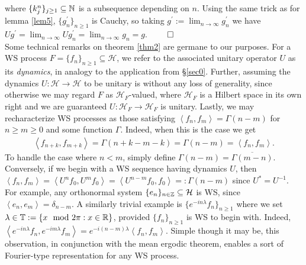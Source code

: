\documentclass[11pt]{report}
\newcommand{\mc}[1]{\mathcal{#1}}
\newcommand{\ip}[2]{\left\langle#1,#2\right\rangle }
\theoremstyle{definition}
\begin{document}
    where $\{k^n_j\}_{j\geq 1}\subseteq\mathbb{N}$ is a subsequence depending on
    $n$. Using the same trick as for lemma \ref{lem5}, $\{g_n^\prime\}_{n\geq
    1}$ is Cauchy, so taking $g^\prime:=\lim_{n\rightarrow\infty}g^\prime_n$ we
    have
    $Ug^\prime=\lim_{n\rightarrow\infty}Ug^\prime_n=\lim_{n\rightarrow\infty}g_n=g$.
    \hfill{$\qed$}\\[5pt]
    \indent Some technical remarks on theorem \ref{thm2} are germane to our
    purposes. For a WS process $F=\{f_n\}_{n\geq 1}\subseteq\mc{H}$, we refer to
    the associated unitary operator $U$ as its \textit{dynamics}, in analogy to
    the application from \S \ref{sec0}. Further, assuming the dynamics
    $U:\mc{H}\rightarrow\mc{H}$ to be unitary is without any loss of generality,
    since otherwise we may regard $F$ as $\mc{H}_F$-valued, where $\mc{H}_F$ is
    a Hilbert space in its own right and we are guaranteed
    $U:\mc{H}_F\rightarrow\mc{H}_F$ is unitary. Lastly, we may recharacterize WS
    processes as those satisfying $\ip{f_n}{f_m}=\Gamma(n-m)$ for $n\geq m\geq
    0$ and some function $\Gamma$. Indeed, when this is the case we get
    \begin{align*}
        \ip{f_{n+k}}{f_{m+k}}=\Gamma(n+k-m-k)=\Gamma(n-m)=\ip{f_n}{f_m}.
    \end{align*}
    To handle the case where $n<m$, simply define
    $\Gamma(n-m)=\overline{\Gamma(m-n)}$. Conversely, if we begin with a WS
    sequence having dynamics $U$, then
    $\ip{f_n}{f_m}=\ip{U^nf_0}{U^mf_0}=\ip{U^{n-m}f_0}{f_0}=:\Gamma(n-m)$ since
    $U^\ast=U^{-1}$. For example, any orthonormal system
    $\{e_n\}_{n\in\mbb{Z}}\subseteq\mc{H}$ is WS, since
    $\ip{e_n}{e_m}=\delta_{n-m}$. A similarly trivial example is
    $\{e^{-in\lambda}f_n\}_{n\geq 1}$ where we set
    $\lambda\in\mathbb{T}:=\{x\mod2\pi:x\in\mathbb{R}\}$, provided $\{f_n\}_{n\geq 1}$
    is WS to begin with. Indeed,
    $\ip{e^{-in\lambda}f_n}{e^{-im\lambda}f_m}=e^{-i(n-m)\lambda}\ip{f_n}{f_m}$.
    Simple though it may be, this observation, in conjunction with the mean
    ergodic theorem, enables a sort of Fourier-type representation for any WS
    process.
\end{document}
